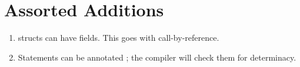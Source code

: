 \section{Assorted Additions}


\begin{enumerate}



\item structs can have  fields.  This goes with call-by-reference. 

\item Statements can be annotated ; the compiler will check them for
      determinacy. 



\end{enumerate}
